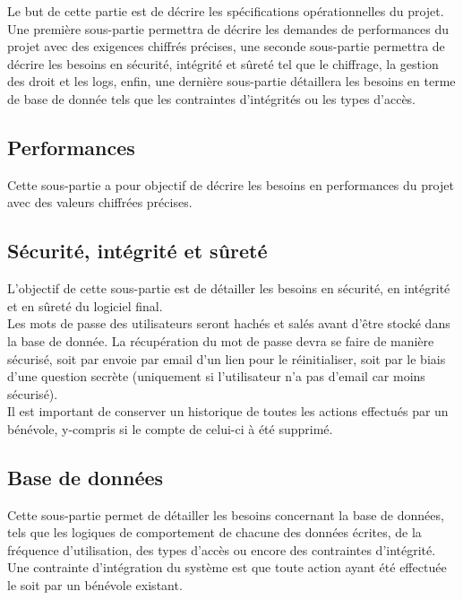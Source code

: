 Le but de cette partie est de décrire les spécifications opérationnelles du projet. Une première sous-partie permettra de décrire les demandes de performances du projet avec des exigences chiffrés précises, une seconde sous-partie permettra de décrire les besoins en sécurité, intégrité et sûreté tel que le chiffrage, la gestion des droit et les logs, enfin, une dernière sous-partie détaillera les besoins en terme de base de donnée tels que les contraintes d'intégrités ou les types d'accès.

\subsection{Performances}

Cette sous-partie a pour objectif de décrire les besoins en performances du projet avec des valeurs chiffrées précises.




\subsection{Sécurité, intégrité et sûreté}

L'objectif de cette sous-partie est de détailler les besoins en sécurité, en intégrité et en sûreté du logiciel final.\\

Les mots de passe des utilisateurs seront hachés et salés avant d'être stocké dans la base de donnée. La récupération du mot de passe devra se faire de manière sécurisé, soit par envoie par email d'un lien pour le réinitialiser, soit par le biais d'une question secrète (uniquement si l'utilisateur n'a pas d'email car moins sécurisé).\\

Il est important de conserver un historique de toutes les actions effectués par un bénévole, y-compris si le compte de celui-ci à été supprimé. 


\subsection{Base de données}

Cette sous-partie permet de détailler les besoins concernant la base de données, tels que les logiques de comportement de chacune des données écrites, de la fréquence d'utilisation, des types d'accès ou encore des contraintes d'intégrité.\\

Une contrainte d'intégration du système est que toute action ayant été effectuée le soit par un bénévole existant.